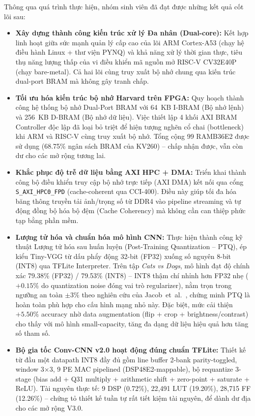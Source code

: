 Thông qua quá trình thực hiện, nhóm sinh viên đã đạt được những kết quả cốt lõi sau:
\begin{itemize}
    \item \textbf{Xây dựng thành công kiến trúc xử lý Đa nhân (Dual-core):} Kết hợp linh hoạt giữa sức mạnh quản lý cấp cao của lõi ARM Cortex-A53 (chạy hệ điều hành Linux + thư viện PYNQ) và khả năng xử lý thời gian thực, tiêu thụ năng lượng thấp của vi điều khiển mã nguồn mở RISC-V CV32E40P (chạy bare-metal). Cả hai lõi cùng truy xuất bộ nhớ chung qua kiến trúc dual-port BRAM mà không gây tranh chấp.
    \item \textbf{Tối ưu hóa kiến trúc bộ nhớ Harvard trên FPGA:} Quy hoạch thành công hệ thống bộ nhớ Dual-Port BRAM với 64~KB I-BRAM (Bộ nhớ lệnh) và 256~KB D-BRAM (Bộ nhớ dữ liệu). Việc thiết lập 4 khối AXI BRAM Controller độc lập đã loại bỏ triệt để hiện tượng nghẽn cổ chai (bottleneck) khi ARM và RISC-V cùng truy xuất bộ nhớ. Tổng cộng 99 RAMB36E2 được sử dụng (68.75\% ngân sách BRAM của KV260) -- chấp nhận được, vẫn còn dư cho các mở rộng tương lai.
    \item \textbf{Khắc phục độ trễ dữ liệu bằng AXI HPC + DMA:} Triển khai thành công bộ điều khiển truy cập bộ nhớ trực tiếp (AXI DMA) kết nối qua cổng \texttt{S\_AXI\_HPC0\_FPD} (cache-coherent qua CCI-400). Điều này giúp tối đa hóa băng thông truyền tải ảnh/trọng số từ DDR4 vào pipeline streaming và tự động đồng bộ hóa bộ đệm (Cache Coherency) mà không cần can thiệp phức tạp bằng phần mềm.
    \item \textbf{Lượng tử hóa và chuẩn hóa mô hình CNN:} Thực hiện thành công kỹ thuật Lượng tử hóa sau huấn luyện (Post-Training Quantization -- PTQ), ép kiểu Tiny-VGG từ dấu phẩy động 32-bit (FP32) xuống số nguyên 8-bit (INT8) qua TFLite Interpreter. Trên tập \textit{Cats vs Dogs}, mô hình đạt độ chính xác 79.38\% (FP32) / 79.53\% (INT8) -- INT8 thậm chí nhỉnh hơn FP32 nhẹ ($+0.15\%$ do quantization noise đóng vai trò regularizer), nằm trọn trong ngưỡng an toàn $\pm 3\%$ theo nghiên cứu của Jacob~et~al.~\cite{jacob2018quantization}, chứng minh PTQ là hoàn toàn phù hợp cho cấu hình mạng nhỏ này. Đặc biệt, mức cải thiện $+5.50\%$ accuracy nhờ data augmentation (flip + crop + brightness/contrast) cho thấy với mô hình small-capacity, tăng đa dạng dữ liệu hiệu quả hơn tăng số tham số.
    \item \textbf{Bộ gia tốc Conv-CNN v2.0 hoạt động đúng chuẩn TFLite:} Thiết kế từ đầu một datapath INT8 đầy đủ gồm line buffer 2-bank parity-toggled, window 3$\times$3, 9 PE MAC pipelined (DSP48E2-mappable), bộ requantize 3-stage (bias add + Q31 multiply + arithmetic shift + zero-point + saturate + ReLU). Tài nguyên thực tế: 9 DSP (0.72\%), 22{,}491 LUT (19.20\%), 28{,}715 FF (12.26\%) -- chứng tỏ thiết kế tuần tự rất tiết kiệm tài nguyên, để dành dư địa cho các mở rộng V3.0.

\end{itemize}
